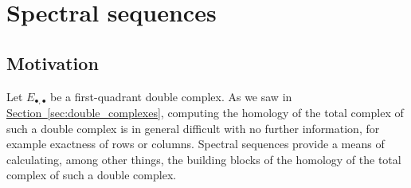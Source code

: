\documentclass[main.tex]{subfiles}
\begin{document}
\chapter{Spectral sequences}
\label{ch:spectral_sequences}

\section{Motivation}
\label{sec:motivation_spectral_sequences}

Let $E_{\bullet,\bullet}$ be a first-quadrant double complex. As we saw in \hyperref[sec:double_complexes]{Section~\ref*{sec:double_complexes}}, computing the homology of the total complex of such a double complex is in general difficult with no further information, for example exactness of rows or columns. Spectral sequences provide a means of calculating, among other things, the building blocks of the homology of the total complex of such a double complex.
\end{document}
